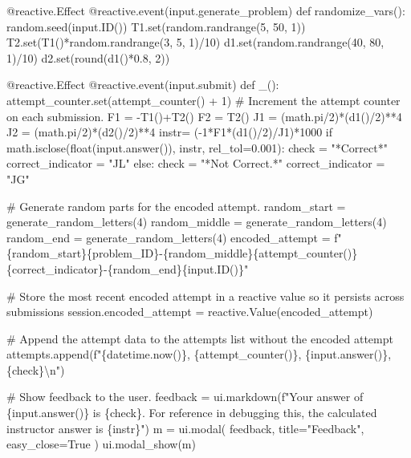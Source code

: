 \documentclass[
  letterpaper,
  DIV=11,
  numbers=noendperiod]{scrreprt}
\newenvironment{Shaded}{\begin{snugshade}}{\end{snugshade}}
\newcommand{\NormalTok}[1]{\textcolor[rgb]{0.00,0.23,0.31}{#1}}
\begin{document}
\begin{Shaded}
\begin{Highlighting}[]
\NormalTok{    @reactive.Effect}
\NormalTok{    @reactive.event(input.generate\_problem)}
\NormalTok{    def randomize\_vars():}
\NormalTok{        random.seed(input.ID())}
\NormalTok{        T1.set(random.randrange(5, 50, 1))}
\NormalTok{        T2.set(T1()*random.randrange(3, 5, 1)/10)}
\NormalTok{        d1.set(random.randrange(40, 80, 1)/10)}
\NormalTok{        d2.set(round(d1()*0.8, 2))}
        
        
        
\NormalTok{    @reactive.Effect}
\NormalTok{    @reactive.event(input.submit)}
\NormalTok{    def \_():}
\NormalTok{        attempt\_counter.set(attempt\_counter() + 1)  \# Increment the attempt counter on each submission.}
\NormalTok{        F1 = {-}T1()+T2()}
\NormalTok{        F2 = T2()}
\NormalTok{        J1 = (math.pi/2)*(d1()/2)**4}
\NormalTok{        J2 = (math.pi/2)*(d2()/2)**4}
\NormalTok{        instr= ({-}1*F1*(d1()/2)/J1)*1000}
\NormalTok{        if math.isclose(float(input.answer()), instr, rel\_tol=0.001):}
\NormalTok{            check = "*Correct*"}
\NormalTok{            correct\_indicator = "JL"}
\NormalTok{        else:}
\NormalTok{            check = "*Not Correct.*"}
\NormalTok{            correct\_indicator = "JG"}

\NormalTok{        \# Generate random parts for the encoded attempt.}
\NormalTok{        random\_start = generate\_random\_letters(4)}
\NormalTok{        random\_middle = generate\_random\_letters(4)}
\NormalTok{        random\_end = generate\_random\_letters(4)}
\NormalTok{        encoded\_attempt = f"\{random\_start\}\{problem\_ID\}{-}\{random\_middle\}\{attempt\_counter()\}\{correct\_indicator\}{-}\{random\_end\}\{input.ID()\}"}

\NormalTok{        \# Store the most recent encoded attempt in a reactive value so it persists across submissions}
\NormalTok{        session.encoded\_attempt = reactive.Value(encoded\_attempt)}

\NormalTok{        \# Append the attempt data to the attempts list without the encoded attempt}
\NormalTok{        attempts.append(f"\{datetime.now()\}, \{attempt\_counter()\}, \{input.answer()\}, \{check\}\textbackslash{}n")}

\NormalTok{        \# Show feedback to the user.}
\NormalTok{        feedback = ui.markdown(f"Your answer of \{input.answer()\} is \{check\}. For reference in debugging this, the calculated instructor answer is \{instr\}")}
\NormalTok{        m = ui.modal(}
\NormalTok{            feedback,}
\NormalTok{            title="Feedback",}
\NormalTok{            easy\_close=True}
\NormalTok{        )}
\NormalTok{        ui.modal\_show(m)}


\end{Highlighting}
\end{Shaded}
\end{document}
